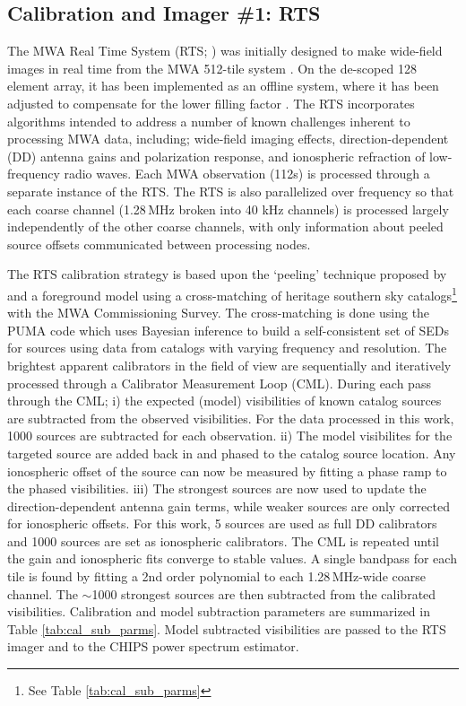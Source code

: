 \documentclass[twolcolumn]{emulateapj}
\begin{document}
\subsection{Calibration and Imager \#1: RTS}
\label{sec:RTS}

The MWA Real Time System (RTS; \cite{Mitchell:2008p707,Ord:2010p8442}) was initially designed to make wide-field images in real time from the MWA 512-tile system \citep{Mitchell:2008p707}.  On the de-scoped 128 element array, it has been implemented as an offline system, where it has been adjusted to compensate for the lower filling factor \citep{Ord:2010p8442}.  The RTS incorporates algorithms intended to address a number of known challenges inherent to processing MWA data, including; wide-field imaging effects, direction-dependent (DD) antenna gains and polarization response, and ionospheric refraction of low-frequency radio waves. Each MWA observation (112s) is processed through a separate instance of the RTS. The RTS is also parallelized over frequency so that each coarse channel (1.28\,MHz broken into 40 kHz channels) is processed largely independently of the other coarse channels, with only information about peeled source offsets communicated between processing nodes.   

The RTS calibration strategy is based upon the `peeling' technique proposed by \cite{Noordam:2004p2379} and a foreground model using a cross-matching of heritage southern sky catalogs\footnote{See Table \ref{tab:cal_sub_parms}} with the MWA Commissioning Survey.  The cross-matching is done using the PUMA code which uses Bayesian inference to build a self-consistent set of SEDs for sources using data from catalogs with varying frequency and resolution. The brightest apparent calibrators in the field of view are sequentially and iteratively processed through a Calibrator Measurement Loop (CML). During each pass through the CML; i) the expected (model) visibilities of known catalog sources are subtracted from the observed visibilities. For the data processed in this work, 1000 sources are subtracted for each observation. ii) The model visibilites for the targeted source are added back in and phased to the catalog source location. Any ionospheric offset of the source can now be measured by fitting a phase ramp to the phased visibilities. iii) The strongest sources are now used to update the direction-dependent antenna gain terms, while weaker sources are only corrected for ionospheric offsets. For this work, 5 sources are used as full DD calibrators and 1000 sources are set as ionospheric calibrators. The CML is repeated until the gain and ionospheric fits converge to stable values. A single bandpass for each tile is found by fitting a 2nd order polynomial to each 1.28\,MHz-wide coarse channel. The $\sim$1000 strongest sources are then subtracted from the calibrated visibilities.   Calibration and model subtraction parameters are summarized in Table \ref{tab:cal_sub_parms}.  Model subtracted visibilities are passed to the RTS imager and to the CHIPS power spectrum estimator. %
\end{document}
